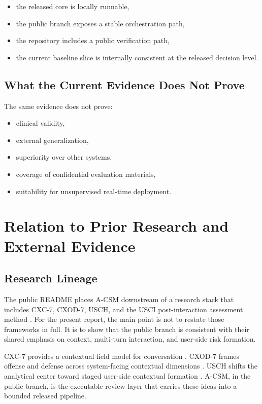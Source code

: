 \documentclass[11pt,a4paper]{article}
\begin{document}
\begin{itemize}[leftmargin=1.8em]
\item the released core is locally runnable,
\item the public branch exposes a stable orchestration path,
\item the repository includes a public verification path,
\item the current baseline slice is internally consistent at the released decision level.
\end{itemize}

\subsection{What the Current Evidence Does Not Prove}

The same evidence does not prove:

\begin{itemize}[leftmargin=1.8em]
\item clinical validity,
\item external generalization,
\item superiority over other systems,
\item coverage of confidential evaluation materials,
\item suitability for unsupervised real-time deployment.
\end{itemize}

\section{Relation to Prior Research and External Evidence}

\subsection{Research Lineage}

The public README places A-CSM downstream of a research stack that includes CXC-7, CXOD-7, USCH, and the USCI post-interaction assessment method \cite{usci}. For the present report, the main point is not to restate those frameworks in full. It is to show that the public branch is consistent with their shared emphasis on context, multi-turn interaction, and user-side risk formation.

CXC-7 provides a contextual field model for conversation \cite{cxc7}. CXOD-7 frames offense and defense across system-facing contextual dimensions \cite{cxod7}. USCH shifts the analytical center toward staged user-side contextual formation \cite{usch}. A-CSM, in the public branch, is the executable review layer that carries these ideas into a bounded released pipeline.
\end{document}
